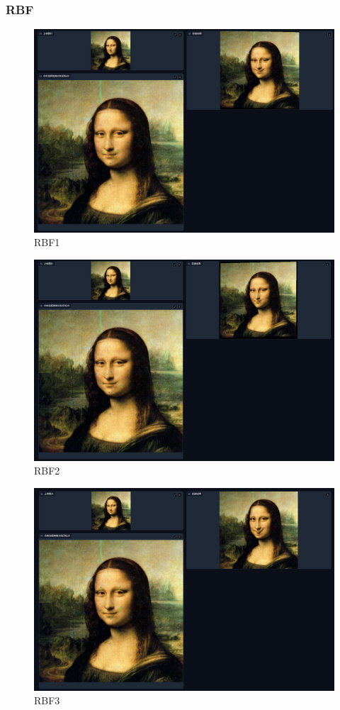 \documentclass{article}
\begin{document}
\subsubsection{RBF}
\begin{figure}[H]
	\centering
	\includegraphics[scale=0.4]{result/point/RBF1}
	\caption{RBF1}
	\label{fig:rbf1}
\end{figure}
\begin{figure}[H]
	\centering
	\includegraphics[scale=0.4]{result/point/RBF2}
	\caption{RBF2}
	\label{fig:rbf2}
\end{figure}
\begin{figure}[H]
	\centering
	\includegraphics[scale=0.4]{result/point/RBF3}
	\caption{RBF3}
	\label{fig:rbf3}
\end{figure}
	
	
	
\end{document}
